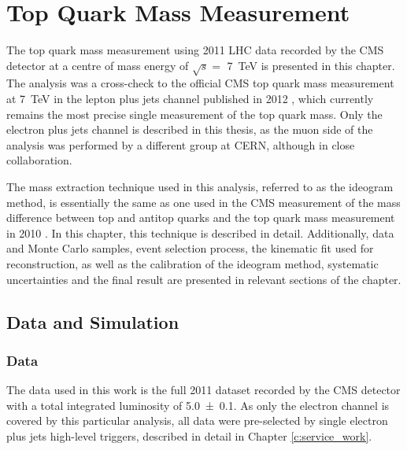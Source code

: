 
\chapter{Top Quark Mass Measurement}
\label{c:top_mass_analysis}
\ifpdf
    \graphicspath{{05_Mass_analysis/plots/}}
\else
    \graphicspath{{05_Mass_analysis/plots/EPS/}{05_Mass_analysis/plots/}}
\fi

The top quark mass measurement using 2011 LHC data recorded by the CMS detector at a centre of mass energy of $\sqrt s
=$ \SI{7}{\TeV} is presented in this chapter. The analysis was a cross-check to the official CMS top quark mass
measurement at \SI{7}{\TeV} in the lepton plus jets channel published in 2012 \autocite{top_mass_ljets_CMS}, which
currently remains the most precise single measurement of the top quark mass. Only the electron plus jets channel is
described in this thesis, as the muon side of the analysis was performed by a different group at CERN, although in close
collaboration.

The mass extraction technique used in this analysis, referred to as the ideogram method, is essentially the same as one
used in the CMS measurement of the mass difference between top and antitop quarks \autocite{mass_difference_CMS} and the
top quark mass measurement in 2010 \autocite{top_mass_ljets_CMS_2010}. In this chapter, this technique is described in
detail. Additionally, data and Monte Carlo samples, event selection process, the kinematic fit used for \ttbar
reconstruction, as well as the calibration of the ideogram method, systematic uncertainties and the final result are
presented in relevant sections of the chapter.

\section{Data and Simulation}
\label{s_top_mass:data_and_simulation}

\subsection{Data}
\label{ss_top_mass:data}
The data used in this work is the full 2011 dataset recorded by the CMS detector with a total integrated luminosity of
\SI{5.0 \pm 0.1}{\fbinv}. As only the electron channel is covered by this particular analysis, all data were
pre-selected by single electron plus jets high-level triggers, described in detail in Chapter \ref{c:service_work}.

